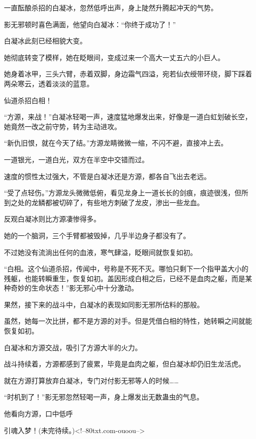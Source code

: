 \begin{this_body}
一直酝酿杀招的白凝冰，忽然低呼出声，身上陡然升腾起冲天的气势。

影无邪顿时喜色满面，他望向白凝冰：“你终于成功了！”

白凝冰此刻已经相貌大变。

她彻底转变了模样，她在眨眼间，变成过来一个高大一丈五六的小巨人。

她身着冰甲，三头六臂，赤着双脚，身边霜气四溢，宛若仙衣绶带环绕，脚下踩着两朵寒云，透着淡淡的蓝意。

仙道杀招白相！

“方源，来战！”白凝冰轻喝一声，速度猛地爆发出来，好像是一道白虹划破长空，她竟然一改之前守势，转为主动进攻。

“新仇旧恨，就在今天了结。”方源龙睛微微一缩，不闪不避，直接冲上去。

一道银光，一道白光，双方在半空中交错而过。

速度的惯性太过强大，不管是白凝冰还是方源，都各自飞出去老远。

“受了点轻伤。”方源龙头微微低俯，看见龙身上一道长长的剑痕，痕迹很浅，但所到之处的龙鳞都被切碎了，有些地方刺破了龙皮，渗出一些龙血。

反观白凝冰则比方源凄惨得多。

她的一个脑洞，三个手臂都被毁掉，几乎半边身子都没有了。

不过她没有流淌出任何的血液，寒气肆溢，眨眼间就恢复如初。

“白相。这个仙道杀招，传闻中，号称是不死不灭。哪怕只剩下一个指甲盖大小的残躯，也能转瞬重生，恢复如初。盖因形成白相之后，已经不是血肉之躯，而是某种奇妙的生命状态！”影无邪心中十分激动。

果然，接下来的战斗中，白凝冰的表现如同影无邪所估料的那般。

虽然，她每一次比拼，都不是方源的对手。但是凭借白相的特性，她转瞬之间就能恢复如初。

白凝冰和方源交战，吸引了方源大半的火力。

战斗持续着，方源都感到了疲累，毕竟是血肉之躯，但白凝冰却仍旧生龙活虎。

就在方源打算放弃白凝冰，专门对付影无邪等人的时候……

“时机到了！”影无邪忽然轻喝一声，身上爆发出无数蛊虫的气息。

他看向方源，口中低呼

引魂入梦！(未完待续。)<!--80txt.com-ouoou-->

\end{this_body}

